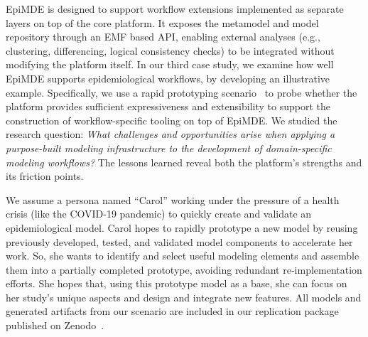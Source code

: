

EpiMDE is designed to support workflow extensions implemented as separate layers on top of the core platform. It exposes the metamodel and model repository through an EMF based API, enabling external analyses (e.g., clustering, differencing, logical consistency checks) to be integrated without modifying the platform itself. In our third case study, we examine how well EpiMDE supports epidemiological workflows, by developing an illustrative example. 
Specifically, we use a rapid prototyping scenario~\cite{fiyouzisabah2024towards} to probe whether the platform provides sufficient expressiveness and extensibility to support the construction of workflow-specific tooling on top of EpiMDE.
We studied the research question: 
\textit{What challenges and opportunities arise when applying a purpose-built modeling infrastructure to the development of domain-specific modeling workflows?} 
The lessons learned reveal both the platform’s strengths and its friction points.

We assume a persona named ``Carol'' working under the pressure of a health crisis (like the COVID-19 pandemic) to quickly create and validate an epidemiological model. 
Carol hopes to rapidly prototype a new model by reusing previously developed, tested, and validated model components to accelerate her work. 
So, she wants to identify and select useful modeling elements and assemble them into a partially completed prototype, avoiding redundant re‐implementation efforts. 
She hopes that, using this prototype model as a base, she can focus on her study's unique aspects and design and integrate new features. 
All models and generated artifacts from our scenario are included in our replication package published on Zenodo~\cite{zenodo_17806440}.

